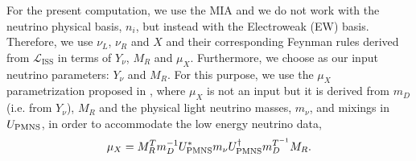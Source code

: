 \documentclass{PoS}
\begin{document}
For the present computation, we use the MIA and we do not work with the neutrino physical basis, $n_i$, but instead with the Electroweak (EW) basis. Therefore, we use $\nu_L$, $\nu_R$ and $X$ and their corresponding  Feynman rules derived from $\mathcal{L}_\mathrm{ISS}$ in terms of $Y_\nu$, $M_R$ and $\mu_X$. Furthermore, we choose as our input neutrino parameters: $Y_\nu$ and $M_R$. For this purpose, we use the $\mu_X$ parametrization proposed in \cite{Arganda:2014dta}, where $\mu_X$ is not an input but it is derived from $m_D$ (i.e. from $Y_\nu$), $M_R$ and the physical light neutrino masses, $m_\nu$, and mixings in $U_{\rm PMNS}$, in order to accommodate the low energy neutrino data,
\begin{equation}
 {\mu_X}={ M_R^T}{ m_D^{-1}} U_{\rm PMNS}^* m_\nu U_{\rm PMNS}^\dagger { m_D^{T^{-1}}}{M_R}.    
\label{muxparam} 
\end{equation}  
\end{document}

